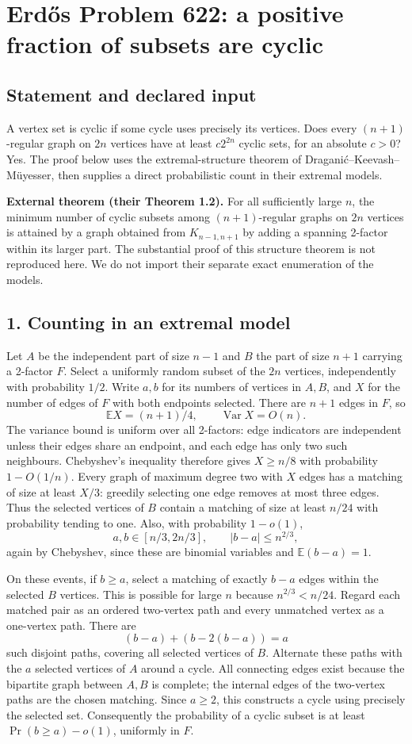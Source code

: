 \section{Erd\H{o}s Problem 622: a positive fraction of subsets are cyclic}
\subsection*{Statement and declared input}
A vertex set is cyclic if some cycle uses precisely its vertices. Does every $(n+1)$-regular graph on $2n$ vertices have at least $c2^{2n}$ cyclic sets, for an absolute $c>0$? Yes. The proof below uses the extremal-structure theorem of Dragani\'c--Keevash--M\"uyesser, then supplies a direct probabilistic count in their extremal models.

\textbf{External theorem (their Theorem 1.2).} For all sufficiently large $n$, the minimum number of cyclic subsets among $(n+1)$-regular graphs on $2n$ vertices is attained by a graph obtained from $K_{n-1,n+1}$ by adding a spanning 2-factor within its larger part.
The substantial proof of this structure theorem is not reproduced here. We do not import their separate exact enumeration of the models.

\subsection*{1. Counting in an extremal model}
Let $A$ be the independent part of size $n-1$ and $B$ the part of size $n+1$ carrying a 2-factor $F$. Select a uniformly random subset of the $2n$ vertices, independently with probability $1/2$. Write $a,b$ for its numbers of vertices in $A,B$, and $X$ for the number of edges of $F$ with both endpoints selected.
There are $n+1$ edges in $F$, so
\[
 \mathbb EX=(n+1)/4,\qquad \operatorname{Var}X=O(n).
\]
The variance bound is uniform over all 2-factors: edge indicators are independent unless their edges share an endpoint, and each edge has only two such neighbours. Chebyshev's inequality therefore gives $X\ge n/8$ with probability $1-O(1/n)$.
Every graph of maximum degree two with $X$ edges has a matching of size at least $X/3$: greedily selecting one edge removes at most three edges. Thus the selected vertices of $B$ contain a matching of size at least $n/24$ with probability tending to one.
Also, with probability $1-o(1)$,
\[
 a,b\in[n/3,2n/3],\qquad |b-a|\le n^{2/3},
 \tag{1}
\]
again by Chebyshev, since these are binomial variables and $\mathbb E(b-a)=1$.

On these events, if $b\ge a$, select a matching of exactly $b-a$ edges within the selected $B$ vertices. This is possible for large $n$ because $n^{2/3}<n/24$. Regard each matched pair as an ordered two-vertex path and every unmatched vertex as a one-vertex path. There are
\[
 (b-a)+(b-2(b-a))=a
\]
such disjoint paths, covering all selected vertices of $B$. Alternate these paths with the $a$ selected vertices of $A$ around a cycle. All connecting edges exist because the bipartite graph between $A,B$ is complete; the internal edges of the two-vertex paths are the chosen matching. Since $a\ge2$, this constructs a cycle using precisely the selected set.
Consequently the probability of a cyclic subset is at least $\Pr(b\ge a)-o(1)$, uniformly in $F$.

